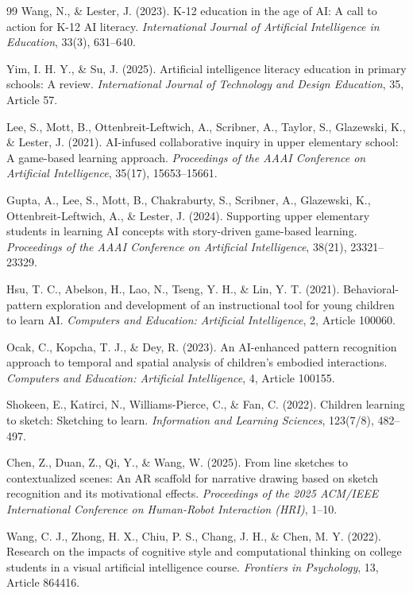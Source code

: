 \begin{thebibliography}{99}
Wang, N., \& Lester, J. (2023). K-12 education in the age of AI: A call to action for K-12 AI literacy. \textit{International Journal of Artificial Intelligence in Education}, 33(3), 631--640.

Yim, I. H. Y., \& Su, J. (2025). Artificial intelligence literacy education in primary schools: A review. \textit{International Journal of Technology and Design Education}, 35, Article 57.

Lee, S., Mott, B., Ottenbreit-Leftwich, A., Scribner, A., Taylor, S., Glazewski, K., \& Lester, J. (2021). AI-infused collaborative inquiry in upper elementary school: A game-based learning approach. \textit{Proceedings of the AAAI Conference on Artificial Intelligence}, 35(17), 15653--15661.

Gupta, A., Lee, S., Mott, B., Chakraburty, S., Scribner, A., Glazewski, K., Ottenbreit-Leftwich, A., \& Lester, J. (2024). Supporting upper elementary students in learning AI concepts with story-driven game-based learning. \textit{Proceedings of the AAAI Conference on Artificial Intelligence}, 38(21), 23321--23329.

Hsu, T. C., Abelson, H., Lao, N., Tseng, Y. H., \& Lin, Y. T. (2021). Behavioral-pattern exploration and development of an instructional tool for young children to learn AI. \textit{Computers and Education: Artificial Intelligence}, 2, Article 100060.

Ocak, C., Kopcha, T. J., \& Dey, R. (2023). An AI-enhanced pattern recognition approach to temporal and spatial analysis of children's embodied interactions. \textit{Computers and Education: Artificial Intelligence}, 4, Article 100155.

Shokeen, E., Katirci, N., Williams-Pierce, C., \& Fan, C. (2022). Children learning to sketch: Sketching to learn. \textit{Information and Learning Sciences}, 123(7/8), 482--497.

Chen, Z., Duan, Z., Qi, Y., \& Wang, W. (2025). From line sketches to contextualized scenes: An AR scaffold for narrative drawing based on sketch recognition and its motivational effects. \textit{Proceedings of the 2025 ACM/IEEE International Conference on Human-Robot Interaction (HRI)}, 1--10.

Wang, C. J., Zhong, H. X., Chiu, P. S., Chang, J. H., \& Chen, M. Y. (2022). Research on the impacts of cognitive style and computational thinking on college students in a visual artificial intelligence course. \textit{Frontiers in Psychology}, 13, Article 864416.


\end{thebibliography}
